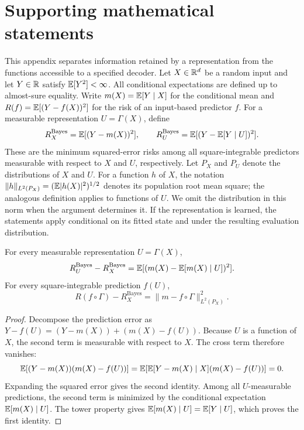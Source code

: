 \section{Supporting mathematical statements}\label{c:app:theory}

This appendix separates information retained by a representation from the
functions accessible to a specified decoder. Let $X\in\mathbb{R}^d$ be a random
input and let $Y\in\mathbb{R}$ satisfy $\mathbb{E}[Y^2]<\infty$. All conditional
expectations are defined up to almost-sure equality. Write
$m(X)=\mathbb{E}[Y\mid X]$ for the conditional mean and
$R(f)=\mathbb{E}[(Y-f(X))^2]$ for the risk of an input-based predictor $f$.
For a measurable representation $U=\Gamma(X)$, define
\[
 R_X^{\mathrm{Bayes}}=\mathbb{E}[(Y-m(X))^2],\qquad
 R_U^{\mathrm{Bayes}}=\mathbb{E}[(Y-\mathbb{E}[Y\mid U])^2].
\]
These are the minimum squared-error risks among all square-integrable
predictors measurable with respect to $X$ and $U$, respectively. Let
$P_X$ and $P_U$ denote the distributions of $X$ and $U$. For a function
$h$ of $X$, the notation
$\|h\|_{L^2(P_X)}=(\mathbb{E}|h(X)|^2)^{1/2}$ denotes its population root mean
square; the analogous definition applies to functions of $U$. We omit
the distribution in this norm when the argument determines it. If the
representation is learned, the statements apply conditional on its fitted
state and under the resulting evaluation distribution.

\begin{proposition}
\label{c:prop:representation-risk}
For every measurable representation $U=\Gamma(X)$,
\[
 R_U^{\mathrm{Bayes}}-R_X^{\mathrm{Bayes}}
 =\mathbb{E}[(m(X)-\mathbb{E}[m(X)\mid U])^2].
\]
For every square-integrable prediction $f(U)$,
\[
 R(f\circ\Gamma)-R_X^{\mathrm{Bayes}}
 =\|m-f\circ\Gamma\|_{L^2(P_X)}^2.
\]
\end{proposition}
\begin{proof}
Decompose the prediction error as
$Y-f(U)=(Y-m(X))+(m(X)-f(U))$. Because $U$ is a function of $X$, the
second term is measurable with respect to $X$. The cross term therefore
vanishes:
\[
 \mathbb{E}[(Y-m(X))(m(X)-f(U))]
 =\mathbb{E}\!\left[\mathbb{E}[Y-m(X)\mid X](m(X)-f(U))\right]=0.
\]
Expanding the squared error gives the second identity. Among all
$U$-measurable predictions, the second term is minimized by the
conditional expectation $\mathbb{E}[m(X)\mid U]$. The tower property gives
$\mathbb{E}[m(X)\mid U]=\mathbb{E}[Y\mid U]$, which proves the first identity.
\end{proof}

